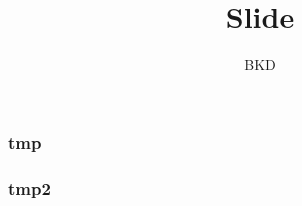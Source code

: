 \documentclass{beamer}
\title{Slide {\LaText}}
\author{BKD}
\begin{document}
\maketitle 

\begin{frame} 
    \frametitle{tmp} 
\end{frame}

\begin{frame} 
    \frametitle{tmp2} 
\end{frame}
\end{document}
